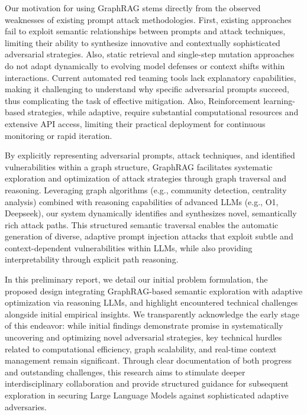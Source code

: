 Our motivation for using GraphRAG stems directly from the observed weaknesses of existing prompt attack methodologies. First, existing approaches fail to exploit semantic relationships between prompts and attack techniques, limiting their ability to synthesize innovative and contextually sophisticated adversarial strategies. Also, static retrieval and single-step mutation approaches do not adapt dynamically to evolving model defenses or context shifts within interactions. Current automated red teaming tools lack explanatory capabilities, making it challenging to understand why specific adversarial prompts succeed, thus complicating the task of effective mitigation. Also, Reinforcement learning-based strategies, while adaptive, require substantial computational resources and extensive API access, limiting their practical deployment for continuous monitoring or rapid iteration.

By explicitly representing adversarial prompts, attack techniques, and identified vulnerabilities within a graph structure, GraphRAG facilitates systematic exploration and optimization of attack strategies through graph traversal and reasoning. Leveraging graph algorithms (e.g., community detection, centrality analysis) combined with reasoning capabilities of advanced LLMs (e.g., O1, Deepseek), our system dynamically identifies and synthesizes novel, semantically rich attack paths. This structured semantic traversal enables the automatic generation of diverse, adaptive prompt injection attacks that exploit subtle and context-dependent vulnerabilities within LLMs, while also providing interpretability through explicit path reasoning.

In this preliminary report, we detail our initial problem formulation, the proposed design integrating GraphRAG-based semantic exploration with adaptive optimization via reasoning LLMs, and highlight encountered technical challenges alongside initial empirical insights. We transparently acknowledge the early stage of this endeavor: while initial findings demonstrate promise in systematically uncovering and optimizing novel adversarial strategies, key technical hurdles related to computational efficiency, graph scalability, and real-time context management remain significant. Through clear documentation of both progress and outstanding challenges, this research aims to stimulate deeper interdisciplinary collaboration and provide structured guidance for subsequent exploration in securing Large Language Models against sophisticated adaptive adversaries.

